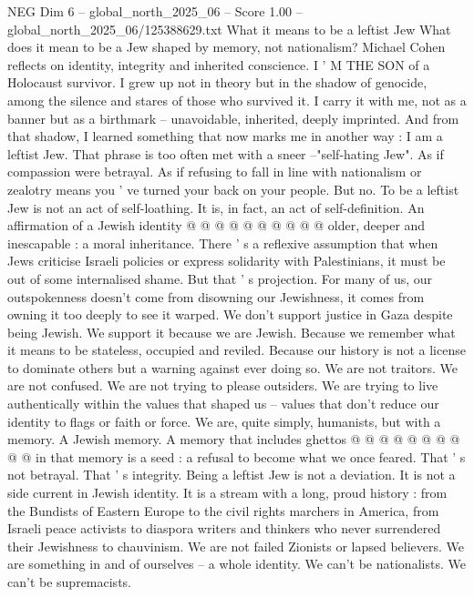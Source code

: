 \begin{textsample}{NEG Dim 6 – global\_north\_2025\_06 – Score 1.00 – global\_north\_2025\_06/125388629.txt}  \label{ex:f6_neg_420}
What it means to be a leftist Jew What does it mean to be a Jew shaped by memory, not nationalism?
Michael Cohen reflects on identity, integrity and inherited conscience.
I ' M THE SON of a Holocaust survivor.
I grew up not in theory but in the shadow of genocide, among the silence and stares of those who survived it.
I carry it with me, not as a banner but as a birthmark -- unavoidable, inherited, deeply imprinted.
And from that shadow, I learned something that now marks me in another way : I am a leftist Jew.
That phrase is too often met with a sneer --"self-hating Jew".
As if compassion were betrayal.
As if refusing to fall in line with nationalism or zealotry means you ' ve turned your back on your people.
But no.
To be a leftist Jew is not an act of self-loathing.
It is, in fact, an act of self-definition.
An affirmation of a Jewish identity @ @ @ @ @ @ @ @ @ @ older, deeper and inescapable : a moral inheritance.
There ' s a reflexive assumption that when Jews criticise Israeli policies or express solidarity with Palestinians, it must be out of some internalised shame.
But that ' s projection.
For many of us, our outspokenness doesn't come from disowning our Jewishness, it comes from owning it too deeply to see it warped.
We don't support justice in Gaza despite being Jewish.
We support it because we are Jewish.
Because we remember what it means to be stateless, occupied and reviled.
Because our history is not a license to dominate others but a warning against ever doing so.
We are not traitors.
We are not confused.
We are not trying to please outsiders.
We are trying to live authentically within the values that shaped us -- values that don't reduce our identity to flags or faith or force.
We are, quite simply, humanists, but with a memory.
A Jewish memory.
A memory that includes ghettos @ @ @ @ @ @ @ @ @ @ in that memory is a seed : a refusal to become what we once feared.
That ' s not betrayal.
That ' s integrity.
Being a leftist Jew is not a deviation.
It is not a side current in Jewish identity.
It is a stream with a long, proud history : from the Bundists of Eastern Europe to the civil rights marchers in America, from Israeli peace activists to diaspora writers and thinkers who never surrendered their Jewishness to chauvinism.
We are not failed Zionists or lapsed believers.
We are something in and of ourselves -- a whole identity.
We can't be nationalists.
We can't be supremacists.

\end{textsample}
